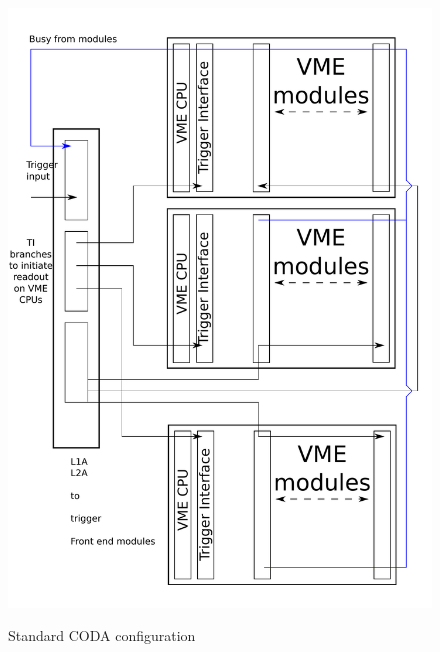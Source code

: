 \documentclass{article}
\begin{document}
\begin{figure}
\includegraphics[scale=0.55]{figs/TS.pdf}\\
\caption{\label{fig:TS} Standard CODA configuration}
\end{figure}
\end{document}
